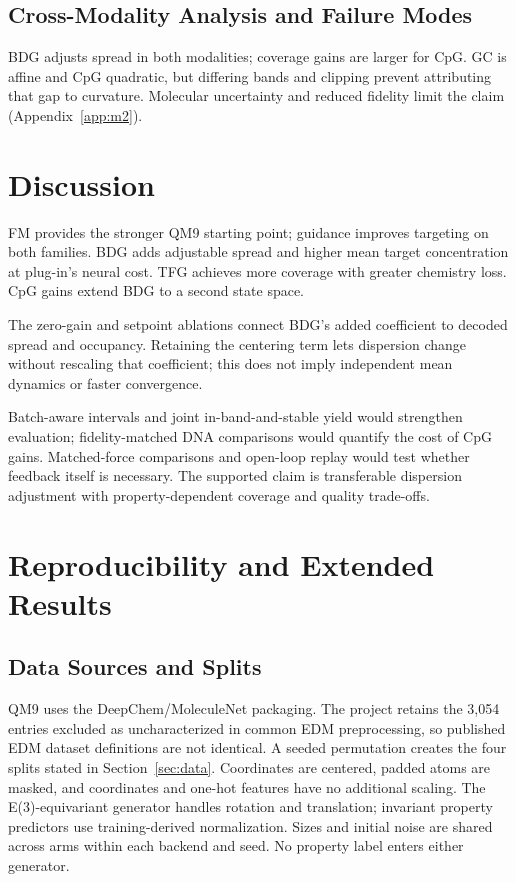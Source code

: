 \documentclass{article}
\begin{document}
\subsection{Cross-Modality Analysis and Failure Modes}\label{sec:failure}
BDG adjusts spread in both modalities; coverage gains are larger for CpG. GC is affine and CpG quadratic, but differing bands and clipping prevent attributing that gap to curvature. Molecular uncertainty and reduced fidelity limit the claim (Appendix~\ref{app:m2}).

\section{Discussion}
FM provides the stronger QM9 starting point; guidance improves targeting on both families. BDG adds adjustable spread and higher mean target concentration at plug-in's neural cost. TFG achieves more coverage with greater chemistry loss. CpG gains extend BDG to a second state space.

The zero-gain and setpoint ablations connect BDG's added coefficient to decoded spread and occupancy. Retaining the centering term lets dispersion change without rescaling that coefficient; this does not imply independent mean dynamics or faster convergence.

Batch-aware intervals and joint in-band-and-stable yield would strengthen evaluation; fidelity-matched DNA comparisons would quantify the cost of CpG gains. Matched-force comparisons and open-loop replay would test whether feedback itself is necessary. The supported claim is transferable dispersion adjustment with property-dependent coverage and quality trade-offs.
\clearpage


\clearpage
\appendix
\renewcommand{\thetable}{S\arabic{table}}
\renewcommand{\theHtable}{S\arabic{table}}
\setcounter{table}{0}
\renewcommand{\thefigure}{S\arabic{figure}}
\renewcommand{\theHfigure}{S\arabic{figure}}
\setcounter{figure}{0}
\section{Reproducibility and Extended Results}
\subsection{Data Sources and Splits}\label{app:data}
QM9 uses the DeepChem/MoleculeNet packaging. The project retains the 3,054 entries excluded as uncharacterized in common EDM preprocessing, so published EDM dataset definitions are not identical. A seeded permutation creates the four splits stated in Section~\ref{sec:data}. Coordinates are centered, padded atoms are masked, and coordinates and one-hot features have no additional scaling. The E(3)-equivariant generator handles rotation and translation; invariant property predictors use training-derived normalization. Sizes and initial noise are shared across arms within each backend and seed. No property label enters either generator.
\end{document}
